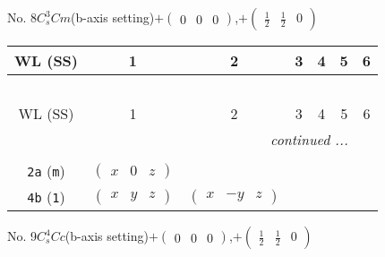 \documentclass[fleqn,9pt,landscape]{jsarticle}
\begin{document}
\newpage
No. 8\quad$C_{s}^{3}$\quad$Cm$\quad(b-axis setting)\quad[ monoclinic ]\quad$+\begin{pmatrix} 0 & 0 & 0 \end{pmatrix}$,\quad $+\begin{pmatrix} \frac{1}{2} & \frac{1}{2} & 0 \end{pmatrix}$
\begin{center}
\renewcommand{\arraystretch}{1.2}
\begin{longtable}{ccccccc}
 \hline \hline
WL (SS) & 1 & 2 & 3 & 4 & 5 & 6 \\ \hline \endfirsthead

\multicolumn{6}{l}{\tablename\ \thetable{}} \\
 \hline \hline
WL (SS) & 1 & 2 & 3 & 4 & 5 & 6 \\ \hline \endhead

 \hline \hline
\multicolumn{6}{r}{\footnotesize\it continued ...} \\ \endfoot

 \hline \hline
\multicolumn{6}{r}{} \\ \endlastfoot

{\tt 2a} ({\tt m}) & $ \begin{pmatrix} x & 0 & z \end{pmatrix} $ & $  $ \\ \hline
{\tt 4b} ({\tt 1}) & $ \begin{pmatrix} x & y & z \end{pmatrix} $ & $ \begin{pmatrix} x & - y & z \end{pmatrix} $ \\
\end{longtable}
\end{center}
\newpage
No. 9\quad$C_{s}^{4}$\quad$Cc$\quad(b-axis setting)\quad[ monoclinic ]\quad$+\begin{pmatrix} 0 & 0 & 0 \end{pmatrix}$,\quad $+\begin{pmatrix} \frac{1}{2} & \frac{1}{2} & 0 \end{pmatrix}$
\end{document}
